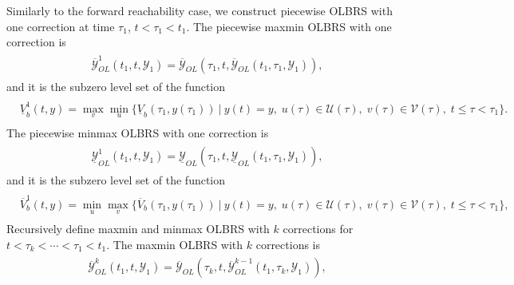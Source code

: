 \documentclass[letterpaper,10pt,english]{sphinxmanual}
\begin{document}
Similarly to the forward reachability case, we construct piecewise OLBRS
with one correction at time \(\tau_1\), \(t<\tau_1<t_1\). The
piecewise maxmin OLBRS with one correction is
\label{chap_reach:equation-maxminb1}\begin{gather}
\begin{split}\overline{{\mathcal Y}}_{OL}^1(t_1, t, {\mathcal Y}_1) = \overline{{\mathcal Y}}_{OL}(\tau_1, t, \overline{{\mathcal Y}}_{OL}(t_1, \tau_1, {\mathcal Y}_1)),\end{split}\label{chap_reach-maxminb1}
\end{gather}
and it is the subzero level set of the function
\label{chap_reach:equation-maxminvfb1}\begin{gather}
\begin{split}\begin{aligned}
\underline{V}^1_b(t, y) =  \max_v\min_u\{\underline{V}_b(\tau_1, y(\tau_1)) ~|~
y(t)=y, \; u(\tau)\in{\mathcal U}(\tau), \;
v(\tau)\in{\mathcal V}(\tau), \; t\leqslant\tau<\tau_1\}.
\end{aligned}\end{split}\label{chap_reach-maxminvfb1}
\end{gather}
The piecewise minmax OLBRS with one correction is
\label{chap_reach:equation-minmaxb1}\begin{gather}
\begin{split}\underline{{\mathcal Y}}_{OL}^1(t_1, t, {\mathcal Y}_1) = \underline{{\mathcal Y}}_{OL}(\tau_1, t, \underline{{\mathcal Y}}_{OL}(t_1, \tau_1, {\mathcal Y}_1)),\end{split}\label{chap_reach-minmaxb1}
\end{gather}
and it is the subzero level set of the function
\label{chap_reach:equation-minmaxvfb1}\begin{gather}
\begin{split}\begin{aligned}
\overline{V}^1_b(t, y) = \min_u\max_v\{\overline{V}_b(\tau_1, y(\tau_1)) ~|~
y(t)=y, \; u(\tau)\in{\mathcal U}(\tau), \;
v(\tau)\in{\mathcal V}(\tau), \; t\leqslant\tau<\tau_1\},
\end{aligned}\end{split}\label{chap_reach-minmaxvfb1}
\end{gather}
Recursively define maxmin and minmax OLBRS with \(k\) corrections
for \(t<\tau_k<\cdots<\tau_1<t_1\). The maxmin OLBRS with \(k\)
corrections is
\label{chap_reach:equation-maxminbk}\begin{gather}
\begin{split}\overline{{\mathcal Y}}_{OL}^k(t_1, t, {\mathcal Y}_1) = \overline{{\mathcal Y}}_{OL}(\tau_k, t, \overline{{\mathcal Y}}_{OL}^{k-1}(t_1, \tau_k, {\mathcal Y}_1)),\end{split}\label{chap_reach-maxminbk}
\end{gather}
\end{document}
